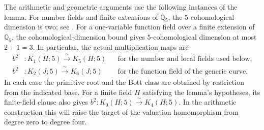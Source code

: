 The arithmetic and geometric arguments use the following instances of
the lemma. For number fields and finite extensions of $\mathbb Q_5$,
the $5$-cohomological dimension is two; see
\cite[VI.\S7 and VI.8.2]{Weibel2013}. For a one-variable function field
over a finite extension of $\mathbb Q_5$, the cohomological-dimension
bound \cite[Lemma~59.95.4, Tag~\texttt{0F0T}]{StacksProject} gives
$5$-cohomological dimension at most $2+1=3$. In particular, the actual
multiplication maps are
\begin{equation}
\label{eq:bott-maps-used}
 \begin{aligned}
  b^2 &:K_1(H;5)\xrightarrow{\ \sim\ }K_5(H;5)
    &&\text{for the number and local fields used below},\\
  b^2 &:K_2(J;5)\xrightarrow{\ \sim\ }K_6(J;5)
    &&\text{for the function field of the generic curve}.
 \end{aligned}
\end{equation}
In each case the primitive root and the Bott class are obtained by
restriction from the indicated base. For a finite field $H$ satisfying
the lemma's hypotheses, its finite-field clause also gives
$b^2:K_0(H;5)\xrightarrow{\sim}K_4(H;5)$. In the arithmetic construction
this will raise the target of the valuation homomorphism from degree
zero to degree four.

